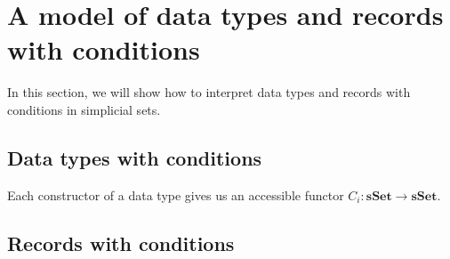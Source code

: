 \documentclass{amsart}
\theoremstyle{definition}
\theoremstyle{remark}
\newcommand{\cat}[1]{\mathbf{#1}}
\newcommand{\sSet}{\cat{sSet}}
\numberwithin{figure}{section}
\begin{document}
\section{A model of data types and records with conditions}

In this section, we will show how to interpret data types and records with conditions in simplicial sets.

\subsection{Data types with conditions}

Each constructor of a data type gives us an accessible functor $C_i : \sSet \to \sSet$.


\subsection{Records with conditions}

% 
% 
\end{document}
